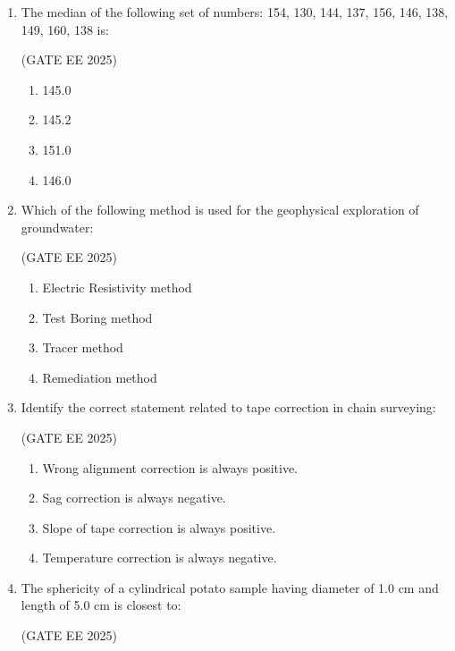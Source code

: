 \documentclass[journal,12pt,onecolumn]{IEEEtran}
\theoremstyle{remark}
\begin{document}
\begin{enumerate}
\item The median of the following set of numbers: 154, 130, 144, 137, 156, 146, 138, 149, 160, 138 is:

\hfill(GATE EE 2025)

\begin{multicols}{4}
\begin{enumerate}
\item 145.0
\item 145.2
\item 151.0
\item 146.0
\end{enumerate}
\end{multicols}

\item Which of the following method is used for the geophysical exploration of groundwater:

\hfill(GATE EE 2025)

\begin{multicols}{2}
\begin{enumerate}
\item Electric Resistivity method
\item Test Boring method
\item Tracer method
\item Remediation method
\end{enumerate}
\end{multicols}

\item Identify the correct statement related to tape correction in chain surveying:

\hfill(GATE EE 2025)

\begin{multicols}{2}
\begin{enumerate}
\item Wrong alignment correction is always positive.
\item Sag correction is always negative.
\item Slope of tape correction is always positive.
\item Temperature correction is always negative.
\end{enumerate}
\end{multicols}

\item The sphericity of a cylindrical potato sample having diameter of 1.0 cm and length of 5.0 cm is closest to:

\hfill(GATE EE 2025)


\end{enumerate}
\end{document}

